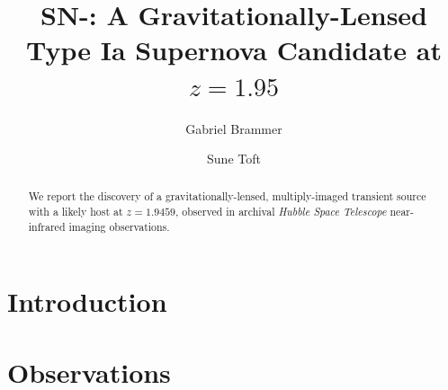\documentclass[twocolumn]{aastex63}
\begin{document}
\title{SN-\sncode: A Gravitationally-Lensed Type Ia Supernova Candidate at $z=1.95$}




\author[0000-0003-2680-005X]{Gabriel Brammer}

\author[0000-0003-3631-7176]{Sune Toft}

\begin{abstract}

We report the discovery of a gravitationally-lensed, multiply-imaged transient source with a likely host at $z=1.9459$, observed in archival \textit{Hubble Space Telescope} near-infrared imaging observations.  

\end{abstract}

\section{Introduction}
\label{s:introduction}



\section{Observations}
\label{s:observations}
\end{document}
